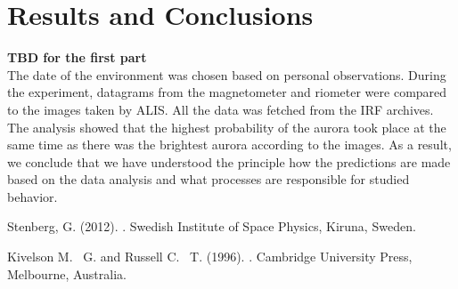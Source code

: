 \documentclass{article}
\begin{document}
\section{Results and Conclusions}

\textbf{TBD for the first part}
\\
The date of the environment was chosen based on personal observations. During the experiment, datagrams from the magnetometer and riometer were compared to the images taken by ALIS. All the data was fetched from the IRF archives. The analysis showed that the highest probability of the aurora took place at the same time as there was the brightest aurora according to the images. As a result, we conclude that we have understood the principle how the predictions are made based on the data analysis and what processes are responsible for studied behavior.


\begin{thebibliography}{9}

Stenberg, G.  (2012).
.
\newblock Swedish Institute of Space Physics, Kiruna, Sweden.

Kivelson M. ~G. and Russell C. ~T.  (1996).
.
\newblock Cambridge University Press, Melbourne, Australia.

\end{thebibliography}
\end{document}

